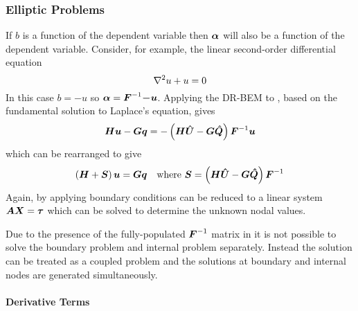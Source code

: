 \subsubsection{Elliptic Problems}

If $b$ is a function of the dependent variable then $\vect{\alpha}$ will also 
be a function of the dependent variable. Consider, for example, the 
linear second-order differential equation
\begin{equation}
  \nabla^{2} {u} + u = 0
\label{eq:helmtypeeqn}
\end{equation}
In this case $b = -u$ so $\vect{\alpha} = \matr{F}^{-1} \vect{-u}$.
Applying the DR-BEM to , based on the fundamental
solution to Laplace's equation, gives
\begin{equation}
  \matr{H} \vect{u} - \matr{G}\vect{q} = - \pbrac{\matr{H} \matr{\hat{U}} -
    \matr{G} \matr{\hat{Q}}} \matr{F}^{-1} \vect{u}
\end{equation}
which can be rearranged to give 
\begin{equation}
  \pbrac{\matr{H} + \matr{S}} \vect{u} = \matr{G}
  \vect{q}\quad\text{where }\matr{S} = \pbrac{\matr{H} \matr{\hat{U}}
    - \matr{G} \matr{\hat{Q}}} \matr{F}^{-1}
\label{eq:drmpotential}
\end{equation}
Again, by applying boundary conditions  can be reduced 
to a linear system $\matr{A} \matr{x} = \matr{\tau}$ which can be solved to
determine the unknown nodal values.

Due to the presence 
of the fully-populated $\matr{F}^{-1}$ matrix in 
 it is not possible to solve the boundary problem and internal 
problem separately. Instead the solution can be treated as a coupled 
problem and the solutions at boundary and internal nodes are generated 
simultaneously.

\paragraph{Derivative Terms}
\label{sec:deriv}

